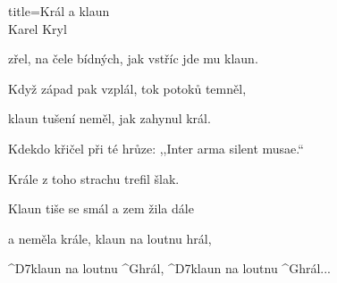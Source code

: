 \begin{song}{title=\predtitle\centering Král a klaun \\\large Karel Kryl  \vspace*{-0.8cm}}
\begin{centerjustified}
	zřel, na čele bídných, jak vstříc jde mu klaun.

	Když západ pak vzplál, tok potoků temněl,

	klaun tušení neměl, jak zahynul král.

	Kdekdo křičel při té hrůze: ,,Inter arma silent musae.``

	Krále z toho strachu trefil šlak.

	Klaun tiše se smál a zem žila dále
	
	a neměla krále, klaun na loutnu hrál,

	^{D7}klaun na loutnu ^{G}hrál, ^{D7}klaun na loutnu ^{G}hrál\elipsa.\elipsa.\elipsa.

\end{centerjustified}
\setcounter{Slokočet}{0}
\end{song}
